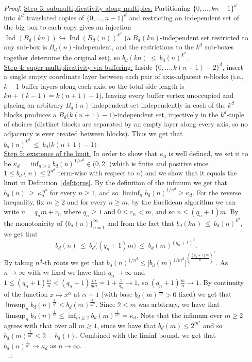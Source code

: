 \documentclass[10pt,a4paper]{amsart}
\DeclareMathOperator{\Ind}{Ind}
\begin{document}
\begin{proof}
\underline{Step 3: submultiplicativity along multiples.} Partitioning $\{0,\dots,kn-1\}^d$ into $k^d$ translated copies of $\{0,\dots,n-1\}^d$ and restricting an independent set of the big box to each copy gives an injection $\Ind(B_d(kn))\hookrightarrow\Ind(B_d(n))^{k^d}$ (a $B_d(kn)$-independent set restricted to any sub-box is $B_d(n)$-independent, and the restrictions to the $k^d$ sub-boxes together determine the original set), so $b_d(kn)\ \le\ b_d(n)^{k^d}$.\\

\underline{Step 4: super-multiplicativity via buffering.} Inside $\{0,\dots,k(n+1)-2\}^d$, insert a single empty coordinate layer between each pair of axis-adjacent $n$-blocks (i.e., $k-1$ buffer layers along each axis, so the total side length is $kn+(k-1)=k(n+1)-1$), leaving every buffer vertex unoccupied and placing an arbitrary $B_d(n)$-independent set independently in each of the $k^d$ blocks produces a $B_d\big(k(n+1)-1\big)$-independent set, injectively in the $k^d$-tuple of choices (distinct blocks are separated by an empty layer along every axis, so no adjacency is ever created between blocks). Thus we get that $b_d(n)^{k^d}\ \le\ b_d\big(k(n+1)-1\big)$.\\

\underline{Step 5: existence of the limit.} In order to show that $\kappa_d$ is well defined, we set it to be $\kappa_d=\inf_{n\ge1}b_d(n)^{1/n^d}\in(0,2]$ (which is finite and positive since $1\le b_d(n)\le 2^{n^d}$ term-wise with respect to $n$) and we show that it equals the limit in  Definition~\ref{def:torus}. By the definition of the infimum we get that $b_d(n)\ \ge\ \kappa_d^{\,n^d}$ for every $n \geq 1$, and so $\liminf_n b_d(n)^{1/n^d}\ge\kappa_d$. For the reverse inequality, fix $m\ge2$ and for every $n\ge m$, by the Euclidean algorithm we can write $n=q_n m+r_n$ where $q_n\ge1$ and $0\le r_n<m$, and so $n\le(q_n+1)m$. By the monotonicity of $\{b_d(n)\}_{n=1}^\infty$ and from the fact that $b_d(kn)\ \le\ b_d(n)^{k^d}$, we get that 
\[
b_d(n)\ \le\ b_d\big((q_n+1)m\big)\ \le\ b_d(m)^{(q_n+1)^d}.
\]
By taking $n^d$-th roots we get that $b_d(n)^{1/n^d}\le \big[b_d(m)^{1/m^d}\big]^{(\frac{(q_n+1)m}{n})^d}$. As $n\to\infty$ with $m$ fixed we have that $q_n\to\infty$ and $1\le(q_n+1)\frac{m}{n}<(q_n+1)\frac{m}{qm}=1+\frac{1}{q_n}\to1$, so $(q_n+1)\frac{m}{n}\to1$. By continuity of the function $x\mapsto x^\alpha$ at $\alpha=1$ (with base $b_d(m)^{\frac{1}{m^d}}>0$ fixed) we get that $\limsup_n b_d(n)^{\frac{1}{n^d}}\le b_d(m)^{\frac{1}{m^d}}$. Since $2\le m$ was arbitrary, we have that $\limsup_n b_d(n)^{\frac{1}{n^d}}\le\inf_{m\ge2}b_d(m)^{\frac{1}{m^d}}=\kappa_d$. Note that the infimum over $m\ge2$ agrees with that over all $m\ge1$, since we have that $b_d(m) \leq 2^{m^d}$ and so $b_d(m)^{\frac{1}{m^d}} \leq 2 =b_d(1)$. Combined with the liminf bound, we get that $b_d(n)^{\frac{1}{n^d}}\to\kappa_d$ as $n\to\infty$.\\ 


\end{proof}
\end{document}
